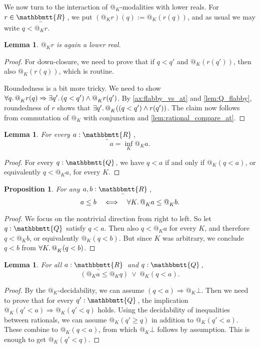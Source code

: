 \documentclass[11pt, oneside, article]{memoir}
\makeatletter
\theoremstyle{plain}
\newtheorem{proposition}[theorem]{Proposition}
\newtheorem{lemma}[theorem]{Lemma}
\theoremstyle{definition}
\theoremstyle{remark}
\newcommand{\ubar}[1]{\underaccent{\bar}{#1}}
\newcommand{\internal}[1]{\raisebox{-.03ex}{$\mathbbmtt{#1}$}}
\newcommand{\hs}{\hspace{1.1pt}}
\newcommand{\tQQ}{\internal{Q}\hs}
\newcommand{\tRR}{\internal{R}\hs}
\newcommand{\tLR}{\ubar{\tRR}\hs}
\newcommand{\AtSymbol}{{@}}
\newcommand{\At}[2][]{\AtSymbol^{#1}_{#2}}
\newcommand{\imp}{\Rightarrow}
\makeatother
\begin{document}
We now turn to the interaction of $\At{K}$-modalities with lower reals. For $r\in\tLR$, we put $(\At{K}r)(q) := \At{K}(r(q))$, and as usual we may write $q<\At{K}r$.

\begin{lemma}
	$\At{K}r$ is again a lower real.	
\end{lemma}

\begin{proof}
	For down-closure, we need to prove that if $q < q'$ and $\At{K}(r(q'))$, then also $\At{K}(r(q))$, which is routine.

	Roundedness is a bit more tricky. We need to show $\forall q\ldotp \At{K} r(q) \imp \exists q'\ldotp (q < q') \land \At{K} r(q')$. By \cref{ax:flabby_vs_at} and \cref{lem:Q_flabby}, roundedness of $r$ shows that $\exists q'\ldotp \At{K}((q < q') \land r(q'))$. The claim now follows from commutation of $\At{K}$ with conjunction and \cref{lem:rational_compare_at}.
\end{proof}

\begin{lemma}
	\label{lem:lower_reals_local}
	For every $a : \tLR$,
	\[
		a = \inf_K \At{K} a.
	\]
\end{lemma}

\begin{proof}
	For every $q : \tQQ$, we have $q < a$ if and only if $\At{K}(q < a)$, or equivalently $q < \At{K}a$, for every $K$.
\end{proof}

\begin{proposition}\label{prop:enough_points_LR}
For any $a,b:\tLR$,
\[
	a \leq b \quad \Longleftrightarrow \quad \forall K\ldotp \At{K} a \leq \At{K} b.
\]
\end{proposition}

\begin{proof}
	We focus on the nontrivial direction from right to left. So let $q:\tQQ$ satisfy $q < a$. Then also $q < \At{K} a$ for every $K$, and therefore $q < \At{K}b$, or equivalently $\At{K}(q < b)$. But since $K$ was arbitrary, we conclude $q < b$ from $\forall K\ldotp \At{K}(q < b)$.
\end{proof}

\begin{lemma}
	\label{lem:at_totally_ordered1}
	For all $a : \tLR$ and $q : \tQQ$,
	\[
		 (\At{K} a \leq \At{K}q) \: \lor \: \At{K}(q < a).
	\]
\end{lemma}

\begin{proof}
	By the $\At{K}$-decidability, we can assume $(q < a) \imp \At{K}\bot$. Then we need to prove that for every $q' : \tQQ$, the implication $\At{K}(q' < a) \imp \At{K}(q' < q)$ holds. Using the decidability of inequalities between rationals, we can assume $\At{K}(q' \geq q)$ in addition to $\At{K}(q' < a)$. These combine to $\At{K}(q < a)$, from which $\At{K}\bot$ follows by assumption. This is enough to get $\At{K}(q' < q)$.
\end{proof}
\end{document}
